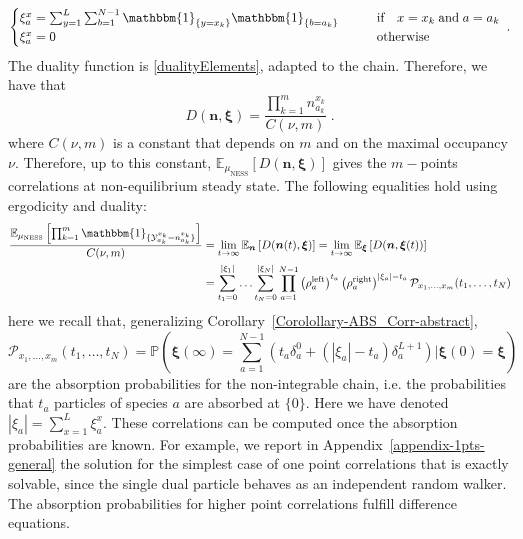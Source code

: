 \documentclass[10pt]{article}
\numberwithin{equation}{section}
\numberwithin{equation}{subsection}
\newcommand{\dt}{\;.}
\begin{document}
\begin{equation}
	\begin{cases}
		\xi_{a}^{x}=\sum_{y=1}^{L}\sum_{b=1}^{N-1}\mathbbm{1}_{\{y=x_{k}\}}\mathbbm{1}_{\{b=a_{k}\}}\qquad &\text{if}\quad x=x_{k}\;\text{and} \; a=a_{k}\\
		\xi_{a}^{x}=0\qquad &\text{otherwise}
	\end{cases}\dt
\end{equation}
The duality function is \eqref{dualityElements}, adapted to the chain. Therefore, we have that
\begin{equation}
	D(\bm{n},\bm{\xi})= \frac{\prod_{k=1}^{m}n_{a_{k}}^{x_{k}}}{C(\nu,m)}\dt
\end{equation}
where $C(\nu,m)$ is a constant that depends on $m$ and on the maximal occupancy $\nu$. 
Therefore, up to this constant, $\mathbb{E}_{\mu_{\text{NESS}}}\left[D(\bm{n},\bm{\xi})\right]$ gives the $m-$points correlations at non-equilibrium steady state. The following equalities hold using ergodicity and duality:
\begin{equation}\label{ExptationSS}
	\begin{split}
		\frac{\mathbb{E}_{\mu_{\text{NESS}}}\left[\prod_{k=1}^{m}\mathbbm{1}_{\{\mathcal{Y}_{a_{k}}^{x_{k}}=n_{a_{k}}^{x_{k}}\}}\right]}{C(\nu,m)}&=\lim_{t\to\infty}\mathbb{E}_{\bm{n}}\left[D(\bm{n}(t),\bm{\xi})\right]=\lim_{t\to\infty}\mathbb{E}_{\bm{\xi}}\left[D(\bm{n},\bm{\xi}(t))\right]
		\\&=
		\sum_{t_{1}=0}^{|\xi_{1}|}\ldots\sum_{t_{N}=0}^{|\xi_{N}|}\prod_{a=1}^{N-1}\left(\rho_{a}^{\text{left}}\right)^{t_{a}}\left(\rho_{a}^{\text{right}}\right)^{|\xi_{a}|-t_{a}}\mathcal{P}_{x_{1},\ldots,x_{m}}(t_{1},\ldots,t_{N})
	\end{split}
\end{equation}
here we recall that, generalizing Corollary~\ref{Corolollary-ABS_Corr-abstract}, %
\begin{equation}\label{Pass} 
	\mathcal{P}_{x_{1},\ldots,x_{m}}(t_{1},\ldots,t_{N})	=\mathbb{P}\left(\bm{\xi}(\infty)=\sum_{a=1}^{N-1}\left(t_{a}\delta_{a}^{0}+(|\xi_{a}|-t_{a})\delta_{a}^{L+1}\right)| \bm{\xi}(0)=\bm{\xi}\right)
\end{equation}
are the absorption probabilities for the non-integrable chain, i.e. the probabilities that $t_{a}$ particles of species $a$ are absorbed at $\{0\}$. Here we have denoted $|\xi_{a}|=\sum_{x=1}^{L}\xi_{a}^{x}$.
 These correlations can be computed once the absorption probabilities are known. For example, we report in Appendix~\ref{appendix-1pts-general} the solution for the simplest case of one point correlations that is exactly solvable, since the single dual particle behaves as an independent random walker. The absorption probabilities for higher point correlations fulfill  difference equations.
\end{document}
